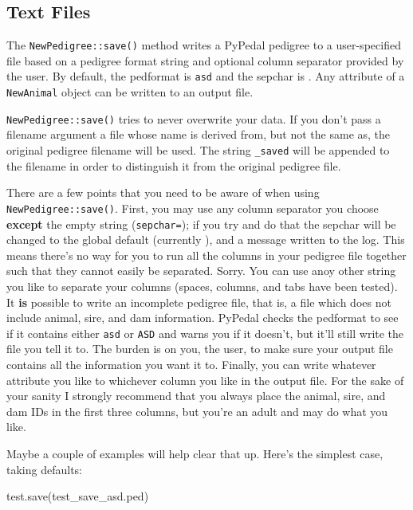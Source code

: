 \documentclass[
  letterpaper,
  DIV=11,
  numbers=noendperiod]{scrreprt}
\newenvironment{Shaded}{\begin{snugshade}}{\end{snugshade}}
\newcommand{\NormalTok}[1]{\textcolor[rgb]{0.00,0.23,0.31}{#1}}
\newcommand{\StringTok}[1]{\textcolor[rgb]{0.13,0.47,0.30}{#1}}
\begin{document}
\subsection{Text Files}\label{text-files}

The \texttt{NewPedigree::save()} method writes a PyPedal pedigree to a
user-specified file based on a pedigree format string and optional
column separator provided by the user. By default, the pedformat is
\texttt{asd} and the sepchar is \texttt{}. Any attribute of a
\texttt{NewAnimal} object can be written to an output file.

\texttt{NewPedigree::save()} tries to never overwrite your data. If you
don't pass a filename argument a file whose name is derived from, but
not the same as, the original pedigree filename will be used. The string
\texttt{\_saved} will be appended to the filename in order to
distinguish it from the original pedigree file.

There are a few points that you need to be aware of when using
\texttt{NewPedigree::save()}. First, you may use any column separator
you choose \textbf{except} the empty string
(\texttt{sepchar=\textquotesingle{}\textquotesingle{}}); if you try and
do that the sepchar will be changed to the global default (currently
\texttt{}), and a message written to the log. This means there's no way
for you to run all the columns in your pedigree file together such that
they cannot easily be separated. Sorry. You can use anoy other string
you like to separate your columns (spaces, columns, and tabs have been
tested). It \textbf{is} possible to write an incomplete pedigree file,
that is, a file which does not include animal, sire, and dam
information. PyPedal checks the pedformat to see if it contains either
\texttt{asd} or \texttt{ASD} and warns you if it doesn't, but it'll
still write the file you tell it to. The burden is on you, the user, to
make sure your output file contains all the information you want it to.
Finally, you can write whatever attribute you like to whichever column
you like in the output file. For the sake of your sanity I strongly
recommend that you always place the animal, sire, and dam IDs in the
first three columns, but you're an adult and may do what you like.

Maybe a couple of examples will help clear that up. Here's the simplest
case, taking defaults:

\begin{Shaded}
\begin{Highlighting}[]
\NormalTok{test.save(}\StringTok{\textquotesingle{}test\_save\_asd.ped\textquotesingle{}}\NormalTok{)}
\end{Highlighting}
\end{Shaded}
\end{document}
